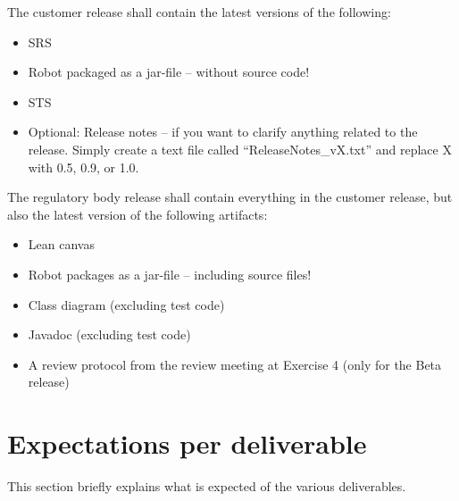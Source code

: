 \documentclass{scrreprt}
\begin{document}
The customer release shall contain the latest versions of the following:

\begin{itemize}
\item SRS
\item Robot packaged as a jar-file -- without source code!
\item STS
\item Optional: Release notes -- if you want to clarify anything related to the release. Simply create a text file called ``ReleaseNotes_vX.txt'' and replace X with 0.5, 0.9, or 1.0.
\end{itemize}

The regulatory body release shall contain everything in the customer release, but also the latest version of the following artifacts:
\begin{itemize}
\item Lean canvas
\item Robot packages as a jar-file -- including source files!
\item Class diagram (excluding test code)
\item Javadoc (excluding test code)
\item A review protocol from the review meeting at Exercise 4 (only for the Beta release)
\end{itemize}

\chapter{Expectations per deliverable}
This section briefly explains what is expected of the various deliverables.
\end{document}
